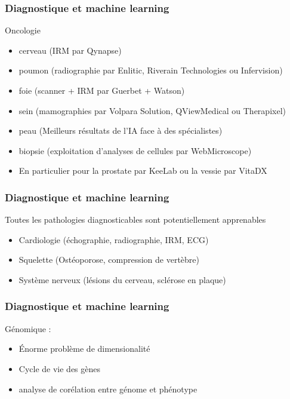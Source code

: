 \documentclass{formation}
\begin{document}
\begin{frame}
  \frametitle{Diagnostique et machine learning}
  Oncologie
  \begin{itemize}
  \item cerveau (IRM par Qynapse)
  \item poumon (radiographie par Enlitic, Riverain Technologies ou Infervision)
  \item foie (scanner + IRM par Guerbet + Watson)
  \item sein (mamographies par Volpara Solution, QViewMedical ou Therapixel)
  \item peau (Meilleurs résultats de l'IA face à des spécialistes)
  \item biopsie (exploitation d'analyses de cellules par WebMicroscope)
  \item     En particulier pour la prostate par KeeLab ou la vessie par VitaDX
  \end{itemize}
\end{frame}

\begin{frame}
  \frametitle{Diagnostique et machine learning}
  Toutes les pathologies diagnosticables sont potentiellement apprenables
    \begin{itemize}
    \item Cardiologie (échographie, radiographie, IRM, ECG)
    \item Squelette (Ostéoporose, compression de vertèbre)
    \item Système nerveux (lésions du cerveau, sclérose en plaque)
    \end{itemize}
\end{frame}

\begin{frame}
  \frametitle{Diagnostique et machine learning}
  Génomique :
  \newline
  \begin{minipage}[c]{0.49\linewidth}
    \begin{itemize}
    \item Énorme problème de dimensionalité
    \item Cycle de vie des gènes
    \item analyse de corélation entre génome et phénotype
    \end{itemize}
  \end{minipage}\hfill
  \begin{minipage}[c]{0.49\linewidth}
  \end{minipage}\hfill
\end{frame}
\end{document}
